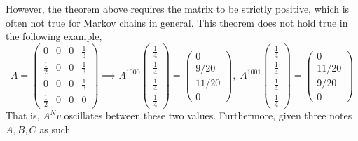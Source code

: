 \documentclass{article}
\newcounter{theorem}[section]
\newcounter{example}[section]
\begin{document}
  However, the theorem above requires the matrix to be strictly positive, which is often not true for Markov chains in general. This theorem does not hold true in the following example, 
  \begin{equation}
    A = \begin{pmatrix}
    0&0&0&\frac{1}{3} \\
    \frac{1}{2}&0&0&\frac{1}{3} \\
    0&0&0&\frac{1}{3} \\
    \frac{1}{2}&0&0&0
    \end{pmatrix} \implies A^{1000} 
        \begin{pmatrix}
    \frac{1}{4} \\ \frac{1}{4} \\ \frac{1}{4} \\ \frac{1}{4}
    \end{pmatrix} = 
        \begin{pmatrix}
    0 \\ 9/20 \\ 11/20 \\ 0
    \end{pmatrix}, \; A^{1001} 
        \begin{pmatrix}
    \frac{1}{4} \\ \frac{1}{4} \\\frac{1}{4} \\ \frac{1}{4}
    \end{pmatrix} = 
        \begin{pmatrix}
    0 \\ 11/20 \\ 9/20 \\ 0
    \end{pmatrix}
  \end{equation}
  That is, $A^N v$ oscillates between these two values. Furthermore, given three notes $A, B, C$ as such
\end{document}
